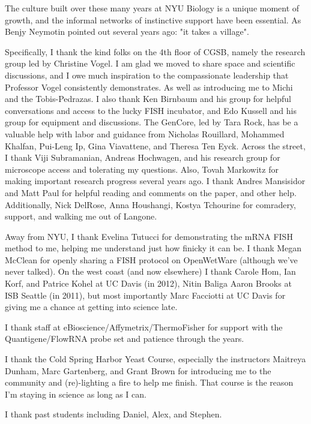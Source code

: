 \documentclass[12pt,letterpaper]{memoir}
\begin{document}
The culture built over these many years at NYU Biology is a unique 
moment of growth, and the informal networks of instinctive support
have been essential.
As Benjy Neymotin pointed out several years ago: "it takes a village".

Specifically,
I thank the kind folks on the 4th floor of CGSB, namely
the research group led by Christine Vogel. I am glad we moved to share
space and scientific discussions, and I owe much inspiration to the 
compassionate leadership that Professor Vogel consistently 
demonstrates. As well as introducing me to Michi and the
Tobis-Pedrazas.
I also thank Ken Birnbaum and his group for helpful conversations and
access to the lucky FISH incubator, and Edo Kussell and his group
for equipment and discussions.
The GenCore, led by Tara Rock, has be a valuable help with labor
and guidance from Nicholas Rouillard, Mohammed Khalfan, Pui-Leng Ip,
Gina Viavattene, and Theresa Ten Eyck.
Across the street, I thank Viji Subramanian, Andreas Hochwagen, 
and his research group for microscope access and tolerating my
questions.
Also, Tovah Markowitz for making important research progress
several years ago.
I thank Andres Mansisidor and Matt Paul for helpful reading and 
comments on the paper, and other help.
Additionally, Nick DelRose, Anna Houshangi, Kostya Tchourine
for comradery, support, and walking me out of Langone.

Away from NYU, I thank
Evelina Tutucci for demonstrating the mRNA FISH method to me,
helping me understand just how finicky it can be.
I thank Megan McClean for openly sharing a FISH protocol on
OpenWetWare (although we've never talked).
On the west coast (and now elsewhere) I thank Carole Hom, Ian Korf, 
and Patrice Kohel at UC Davis (in 2012), 
Nitin Baliga Aaron Brooks at ISB Seattle (in 2011), 
but most importantly Marc Facciotti at UC Davis for 
giving me a chance at getting into science late.



I thank staff at eBioscience/Affymetrix/ThermoFisher for support with
the Quantigene/FlowRNA probe set and patience through the years.

I thank the Cold Spring Harbor Yeast Course, especially the instructors
Maitreya Dunham, Marc Gartenberg, and Grant Brown for introducing
me to the community and (re)-lighting a fire to help me finish.
That course is the reason I'm staying in science as long as I can.

I thank past students including Daniel, Alex, and Stephen.
\end{document}
